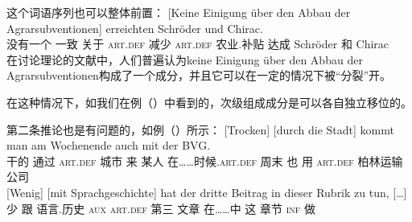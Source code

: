 这个词语序列也可以整体前置：
\ea
\gll {}[Keine Einigung über den Abbau der Agrarsubventionen] erreichten Schröder und Chirac.\\
     \spacebr{}没有一个 一致 关于 \textsc{art}.\textsc{def} 减少 \textsc{art}.\textsc{def} 农业.补贴  达成 Schröder 和 Chirac\\
\z
在讨论理论的文献中，人们普遍认为keine Einigung über den Abbau der Agrarsubventionen构成了一个成分，并且它可以在一定的情况下被“分裂”开。

\noindent
在这种情况下，如我们在例（）中看到的，次级组成成分是可以各自独立移位的。\citep{deKuthy2002a} 

第二条推论也是有问题的，如例（）所示：
\eal
\label{bsp-mehr-vf}
\ex\label{bsp-trocken-durch-die-stadt}
\gll {}[Trocken]       [durch        die          Stadt] kommt man am                       Wochenende auch mit der BVG.\footnotemark\\
       \spacebr{}干的 \spacebr{}通过 \textsc{art}.\textsc{def} 城市   来    某人 在……时候.\textsc{art}.\textsc{def} 周末 也 用 \textsc{art}.\textsc{def} 柏林运输公司\\
\ex 
\gll {}[Wenig]     [mit Sprachgeschichte] hat der dritte Beitrag in dieser Rubrik zu tun, [\ldots]\footnotemark\\
       \spacebr{}少 \spacebr{}跟 语言.历史 \textsc{aux} \textsc{art}.\textsc{def} 第三 文章 在……中 这 章节 \textsc{inf} 做\\
\zl

